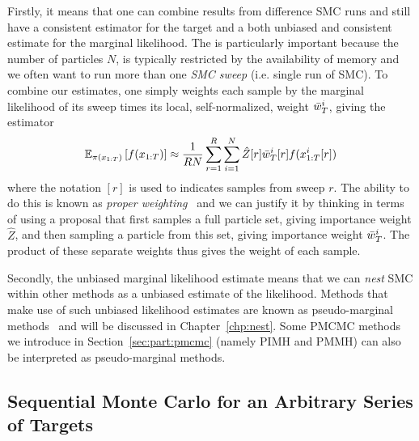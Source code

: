 Firstly, it means that one can combine
results from difference SMC runs and still have a consistent estimator for the target and a both unbiased and
consistent estimate for the marginal likelihood.
The is particularly important because the number of particles $N$, is typically restricted by the availability of memory
and we often want to run more than one \emph{SMC sweep} (i.e. single run of SMC).
To combine our estimates, one simply weights each sample by the marginal likelihood of its sweep times
its local, self-normalized, weight $\bar w_T^i$, giving the estimator
\begin{align}
\label{eq:part:ind-smc}
\mathbb{E}_{\pi (x_{1:T})} \left[f(x_{1:T})\right] \approx \frac{1}{RN} \sum_{r=1}^{R}\sum_{i=1}^{N} \hat{Z}[r] \bar w_T^i[r] f(x_{1:T}^i[r])
\end{align}
where the notation $[r]$ is used to indicates samples from sweep $r$.
 The ability to do this is known as \emph{proper weighting}~\citep{andersson2015nested} and we can justify it by
thinking in terms of using a proposal that first samples a full particle set, giving importance weight $\hat Z$, and then sampling a particle
from this set, giving importance weight $\bar w_T^i$.  The product of these separate weights thus gives the weight of
each sample.  

Secondly, the unbiased marginal likelihood estimate means that we can \emph{nest} SMC within other 
methods as a unbiased estimate of the likelihood.
Methods that make use of such unbiased likelihood estimates are known as pseudo-marginal
methods~\citep{andrieu2009pseudo} and will be discussed in Chapter~\ref{chp:nest}.
Some PMCMC methods we introduce in Section~\ref{sec:part:pmcmc} (namely PIMH and PMMH) 
can also be interpreted as pseudo-marginal methods.
%

\subsection{Sequential Monte Carlo for an Arbitrary Series of Targets}
\label{sec:part:smc:arb}

